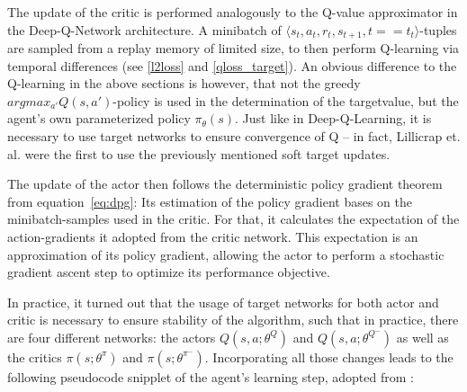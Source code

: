 The update of the critic is performed analogously to the Q-value approximator in the Deep-Q-Network architecture. A minibatch of $\langle s_t, a_t, r_t, s_{t+1}, t==t_t \rangle$-tuples are sampled from a replay memory of limited size, to then perform Q-learning via temporal differences (see \ref{l2loss} and \ref{qloss_target}). An obvious difference to the Q-learning in the above sections is however, that not the greedy $argmax_{a'}Q(s,a')$-policy is used in the determination of the targetvalue, but the agent's own parameterized policy $\pi_\theta(s)$. Just like in Deep-Q-Learning, it is necessary to use target networks to ensure convergence of Q -- in fact, Lillicrap et. al. \cite{lillicrap_continuous_2015} were the first to use the previously mentioned soft target updates.

The update of the actor then follows the deterministic policy gradient theorem from equation~\ref{eq:dpg}: Its estimation of the policy gradient bases on the minibatch-samples used in the critic. For that, it calculates the expectation of the action-gradients it adopted from the critic network. This expectation is an approximation of its policy gradient, allowing the actor to perform a stochastic gradient ascent step to optimize its performance objective.

In practice, it turned out that the usage of target networks for both actor and critic is necessary to ensure stability of the algorithm, such that in practice, there are four different networks: the actors $Q(s,a;\theta^Q)$ and $Q(s,a;\theta^{Q^-})$ as well as the critics $\pi(s;\theta^\pi)$ and $\pi(s;\theta^{\pi^-})$. Incorporating all those changes leads to the following pseudocode snipplet of the agent's learning step, adopted from \cite{lillicrap_continuous_2015}: \\

